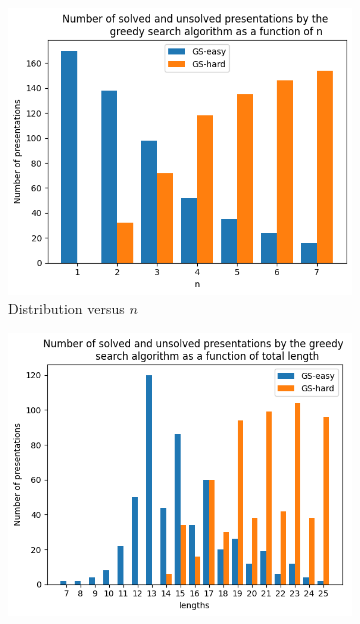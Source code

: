 

\begin{figure}
	\centering
	\begin{subfigure}[b]{0.5\textwidth}
		\includegraphics[width=\textwidth]{fig/hist_vs_n.png}
		\caption{Distribution versus $n$}
		\label{fig:hist_vs_n}
	\end{subfigure}%
	\begin{subfigure}[b]{0.5\textwidth}
		\centering
		\includegraphics[width=1.1\textwidth]{fig/hist_vs_lengths.png}

\end{subfigure}
\end{figure}
